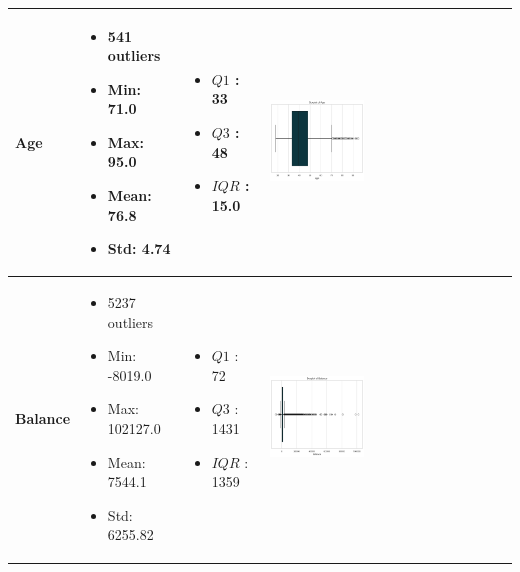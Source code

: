 \documentclass{article}
\begin{document}
\begin{longtable}{|p{}|p{}|p{}|p{}|}
            \textbf{Age} & 
            \begin{itemize}
                \item 541 outliers
                \item Min: 71.0
                \item Max: 95.0
                \item Mean: 76.8
                \item Std: 4.74
            \end{itemize} & 
            \begin{itemize}
                \item $Q1$ : 33
                \item $Q3$ : 48
                \item $IQR$ : 15.0
            \end{itemize} &
            \includegraphics[width=0.40\textwidth]{data/bank_marketing/pic/Outlier/Age.png} \\
            \hline
            \textbf{Balance} & 
            \begin{itemize}
                \item 5237 outliers
                \item Min: -8019.0
                \item Max: 102127.0
                \item Mean: 7544.1
                \item Std: 6255.82
            \end{itemize} & 
            \begin{itemize}
                \item $Q1$ : 72
                \item $Q3$ : 1431
                \item $IQR$ : 1359
            \end{itemize} &
            \includegraphics[width=0.40\textwidth]{data/bank_marketing/pic/Outlier/balance.png} \\

\end{longtable}
\end{document}
